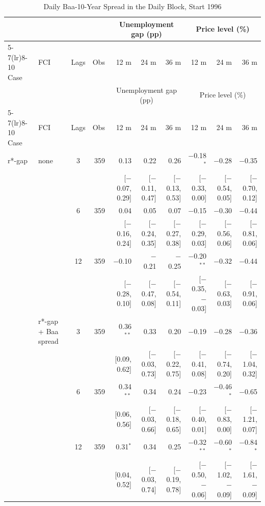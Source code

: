 \begingroup\scriptsize\setlength{\tabcolsep}{0.9pt}
\begin{longtable}{llcrrrrrrr}
\caption{Daily Baa-10-Year Spread in the Daily Block, Start 1996}\label{tab:appR3c}\\
\toprule
 & & & & \multicolumn{3}{c}{Unemployment gap (pp)} & \multicolumn{3}{c}{Price level (\%)}\\ \cmidrule(lr){5-7}\cmidrule(lr){8-10}
Case & FCI & Lags & Obs & 12 m & 24 m & 36 m & 12 m & 24 m & 36 m\\
\midrule\endfirsthead
\toprule
 & & & & \multicolumn{3}{c}{Unemployment gap (pp)} & \multicolumn{3}{c}{Price level (\%)}\\ \cmidrule(lr){5-7}\cmidrule(lr){8-10}
Case & FCI & Lags & Obs & 12 m & 24 m & 36 m & 12 m & 24 m & 36 m\\
\midrule\endhead
\bottomrule\endfoot
r*-gap & none & 3 & 359 & 0.13 & 0.22 & 0.26 & $-$0.18$^{*}$ & $-$0.28 & $-$0.35\\
 & & & & {\scriptsize [$-$0.07, 0.29]} & {\scriptsize [$-$0.11, 0.47]} & {\scriptsize [$-$0.13, 0.53]} & {\scriptsize [$-$0.33, 0.00]} & {\scriptsize [$-$0.54, 0.05]} & {\scriptsize [$-$0.70, 0.12]}\\
 &  & 6 & 359 & 0.04 & 0.05 & 0.07 & $-$0.15 & $-$0.30 & $-$0.44\\
 & & & & {\scriptsize [$-$0.16, 0.24]} & {\scriptsize [$-$0.24, 0.35]} & {\scriptsize [$-$0.27, 0.38]} & {\scriptsize [$-$0.29, 0.03]} & {\scriptsize [$-$0.56, 0.06]} & {\scriptsize [$-$0.81, 0.06]}\\
 &  & 12 & 359 & $-$0.10 & $-$0.21 & $-$0.25 & $-$0.20$^{**}$ & $-$0.32 & $-$0.44\\
 & & & & {\scriptsize [$-$0.28, 0.10]} & {\scriptsize [$-$0.47, 0.08]} & {\scriptsize [$-$0.54, 0.11]} & {\scriptsize [$-$0.35, $-$0.03]} & {\scriptsize [$-$0.63, 0.03]} & {\scriptsize [$-$0.91, 0.06]}\\
 & r*-gap + Baa spread & 3 & 359 & 0.36$^{**}$ & 0.33 & 0.20 & $-$0.19 & $-$0.28 & $-$0.36\\
 & & & & {\scriptsize [0.09, 0.62]} & {\scriptsize [$-$0.03, 0.73]} & {\scriptsize [$-$0.22, 0.75]} & {\scriptsize [$-$0.41, 0.08]} & {\scriptsize [$-$0.74, 0.20]} & {\scriptsize [$-$1.04, 0.32]}\\
 &  & 6 & 359 & 0.34$^{**}$ & 0.34 & 0.24 & $-$0.23 & $-$0.46$^{*}$ & $-$0.65\\
 & & & & {\scriptsize [0.06, 0.56]} & {\scriptsize [$-$0.03, 0.66]} & {\scriptsize [$-$0.18, 0.65]} & {\scriptsize [$-$0.40, 0.01]} & {\scriptsize [$-$0.83, 0.00]} & {\scriptsize [$-$1.21, 0.07]}\\
 &  & 12 & 359 & 0.31$^{*}$ & 0.34 & 0.25 & $-$0.32$^{**}$ & $-$0.60$^{*}$ & $-$0.84$^{*}$\\
 & & & & {\scriptsize [0.04, 0.52]} & {\scriptsize [$-$0.03, 0.74]} & {\scriptsize [$-$0.19, 0.78]} & {\scriptsize [$-$0.50, $-$0.06]} & {\scriptsize [$-$1.02, $-$0.09]} & {\scriptsize [$-$1.61, $-$0.09]}\\
\end{longtable}
